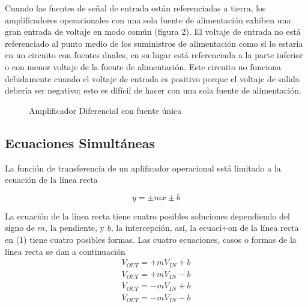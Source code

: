 \documentclass[12pt]{article}
\begin{document}
	Cuando las fuentes de señal de entrada están referenciadas a tierra, los amplificadores operacionales con una sola fuente de alimentación exhiben una gran entrada de voltaje en modo común (figura 2). El voltaje de entrada no está referenciado al punto medio de los suministros de alimentación como sí lo estaría en un circuito con fuentes duales, en su lugar está referenciada a la parte inferior o con menor voltaje de la fuente de alimentación.
	Este circuito no funciona debidamente cuando el voltaje de entrada es positivo porque el voltaje de salida debería ser negativo; esto es difícil de hacer con una sola fuente de alimentación. 
	
	\begin{figure}[H]
		\centering	
		\caption{Amplificador Diferencial con fuente única}	
		\label{fig:figura2}
	\end{figure}
	
	\subsection*{Ecuaciones Simultáneas}
	La función de transferencia de un aplificador operacional está limitado a la ecuación de la línea recta
	
	\begin{tcolorbox}[colback=red!5!white,colframe=red!75!black,arc=0mm,boxrule=0mm,width=(\linewidth+0.5cm)]
		\begin{equation}
		y = \pm mx \pm b
		\end{equation}
	\end{tcolorbox}
	
	La ecuación de la línea recta tiene cuatro posibles soluciones dependiendo del signo de $m$, la pendiente, y $b$, la intercepción, así, la ecuaci+on de la línea recta en (1) tiene cuatro posibles formas. Las cuatro ecuaciones, casos o formas de la línea recta se dan a continuación
	\begin{align}
		V_{OUT} = + mV_{IN} + b\\
		V_{OUT} = + mV_{IN} - b\\
		V_{OUT} = - mV_{IN} + b\\
		V_{OUT} = - mV_{IN} - b
	\end{align}
\end{document}

